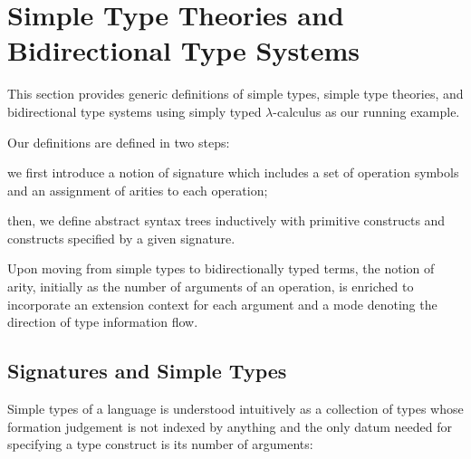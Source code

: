 
\section{Simple Type Theories and Bidirectional Type Systems}\label{sec:defs}
This section provides generic definitions
of simple types, simple type theories, and bidirectional type systems using simply typed $\lambda$-calculus as our running example.

Our definitions are defined in two steps:
\begin{enumerate*}
\item we first introduce a notion of signature which includes a set of operation symbols and an assignment of arities to each operation;
\item then, we define abstract syntax trees inductively with primitive constructs and constructs specified by a given signature.
\end{enumerate*}
Upon moving from simple types to bidirectionally typed terms, the notion of arity, initially as the number of arguments of an operation, is enriched to incorporate an extension context for each argument and a mode denoting the direction of type information flow.

\subsection{Signatures and Simple Types} \label{subsec:simple-types}
Simple types of a language is understood intuitively as a collection of types whose formation judgement is not indexed by anything and the only datum needed for specifying a type construct is its number of arguments: 

